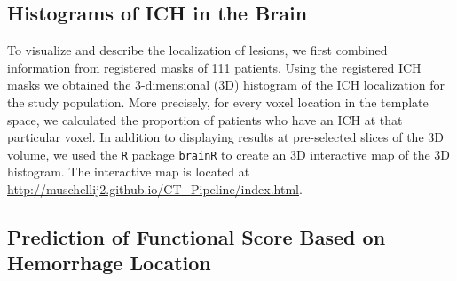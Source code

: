 \documentclass[10pt]{article}\usepackage[]{graphicx}\usepackage[]{color}
\begin{document}




\subsection*{Histograms of ICH in the Brain}

To visualize and describe the localization of lesions, we first combined information from registered masks of 111 patients.  Using the registered ICH masks we obtained the $3$-dimensional (3D) histogram of the ICH localization for the study population. More precisely, for every voxel location in the template space, we calculated the proportion of patients who have an ICH at that particular voxel.  In addition to displaying results at pre-selected slices of the 3D volume, we used the \verb|R| package \verb|brainR| to create an 3D interactive map of the 3D histogram.  The interactive map is located at \url{http://muschellij2.github.io/CT_Pipeline/index.html}.  


\subsection*{Prediction of Functional Score Based on Hemorrhage Location}
\end{document}
